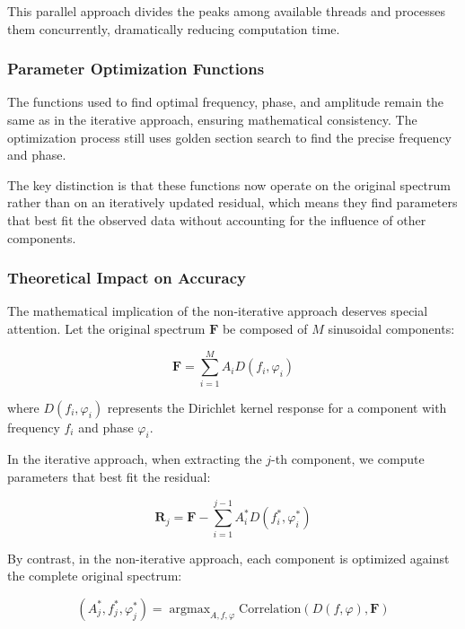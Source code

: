 \documentclass[11pt,twoside]{report}
\DeclareMathOperator*{\argmax}{argmax}
\numberwithin{thm}{section}
\numberwithin{equation}{section}
\DeclareMathOperator*{\argmax}{arg\,max}
\begin{document}
This parallel approach divides the peaks among available threads and processes them concurrently, dramatically reducing computation time.

\subsubsection{Parameter Optimization Functions}

The functions used to find optimal frequency, phase, and amplitude remain the same as in the iterative approach, ensuring mathematical consistency. The optimization process still uses golden section search to find the precise frequency and phase.

The key distinction is that these functions now operate on the original spectrum rather than on an iteratively updated residual, which means they find parameters that best fit the observed data without accounting for the influence of other components.

\subsubsection{Theoretical Impact on Accuracy}

The mathematical implication of the non-iterative approach deserves special attention. Let the original spectrum $\mathbf{F}$ be composed of $M$ sinusoidal components:

\begin{equation}
\mathbf{F} = \sum_{i=1}^{M} A_i D(f_i, \varphi_i)
\end{equation}

where $D(f_i, \varphi_i)$ represents the Dirichlet kernel response for a component with frequency $f_i$ and phase $\varphi_i$.

In the iterative approach, when extracting the $j$-th component, we compute parameters that best fit the residual:

\begin{equation}
\mathbf{R}_j = \mathbf{F} - \sum_{i=1}^{j-1} A_i^* D(f_i^*, \varphi_i^*)
\end{equation}

By contrast, in the non-iterative approach, each component is optimized against the complete original spectrum:

\begin{equation}
(A_j^*, f_j^*, \varphi_j^*) = \argmax_{A, f, \varphi} \text{Correlation}(D(f, \varphi), \mathbf{F})
\end{equation}
\end{document}
